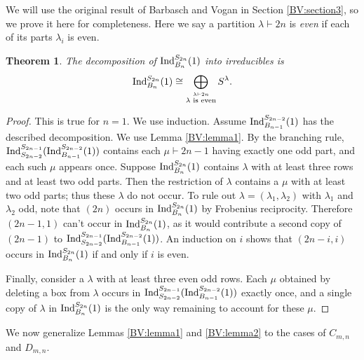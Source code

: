 \documentclass[12pt]{amsart}
\newtheorem{theorem}{Theorem}
\numberwithin{theorem}{section}
\newcommand{\Ind}{\textup{Ind}}
\begin{document}
We will use the original result of Barbasch and Vogan in Section \ref{BV:section3}, so we prove it here for completeness.
Here we say a partition $\lambda \vdash 2n$ is {\em even} if each of its parts $\lambda_i$ is even.

\begin{theorem}\label{BV:theorem1}
The decomposition of $\Ind_{B_n}^{S_{2n}}(1)$ into irreducibles is 
$$\Ind_{B_n}^{S_{2n}}(1) \cong \bigoplus_{\stackrel{\lambda \vdash 2n}{\lambda  \textup{ is even}}} S^\lambda.$$
\end{theorem}
\begin{proof}
This is true for $n=1$.
We use induction.
Assume $\Ind_{B_{n-1}}^{S_{2n-2}}(1)$ has the described decomposition.
We use Lemma \ref{BV:lemma1}.
By the branching rule, $\Ind^{S_{2n-1}}_{S_{2n-2}}(\Ind_{B_{n-1}}^{S_{2n-2}}(1))$ contains each $\mu \vdash 2n-1$ having exactly one odd part, and each such $\mu$ appears once.
Suppose $\Ind_{B_n}^{S_{2n}}(1)$ contains $\lambda$ with at least three rows and at least two odd parts.
Then the restriction of $\lambda$ contains a $\mu$ with at least two odd parts; thus these $\lambda$ do not occur.
To rule out $\lambda=(\lambda_1,\lambda_2)$ with $\lambda_1$ and $\lambda_2$ odd, note that $(2n)$ occurs in $\Ind_{B_n}^{S_{2n}}(1)$ by Frobenius reciprocity.
Therefore $(2n-1,1)$ can't occur in $\Ind_{B_n}^{S_{2n}}(1)$, as it would contribute a second copy of $(2n-1)$ to $\Ind^{S_{2n-1}}_{S_{2n-2}}(\Ind_{B_{n-1}}^{S_{2n-2}}(1))$.
An induction on $i$ shows that $(2n-i,i)$ occurs in $\Ind_{B_n}^{S_{2n}}(1)$ if and only if $i$ is even.

Finally, consider a $\lambda$ with at least three even odd rows.
Each $\mu$ obtained by deleting a box from $\lambda$ occurs in $\Ind^{S_{2n-1}}_{S_{2n-2}}(\Ind_{B_{n-1}}^{S_{2n-2}}(1))$ exactly once, and a single copy of $\lambda$ in $\Ind_{B_n}^{S_{2n}}(1)$ is the only way remaining to account for these $\mu$.
\end{proof}

We now generalize Lemmas \ref{BV:lemma1} and \ref{BV:lemma2} to the cases of $C_{m,n}$ and $D_{m,n}$.
\end{document}
